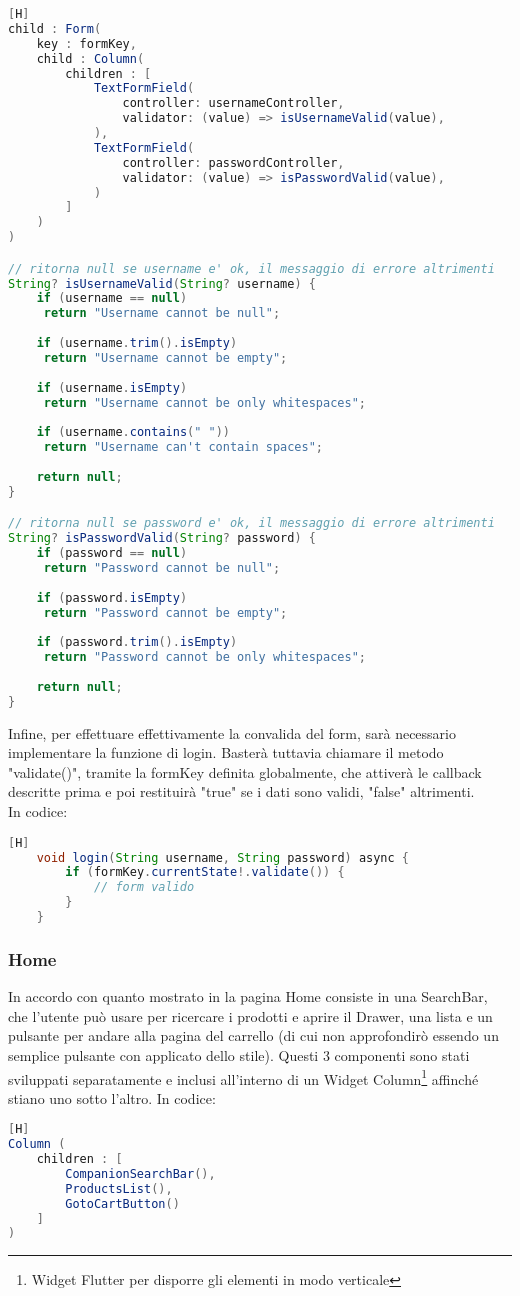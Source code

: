 \begin{lstlisting}[language=Java, firstnumber=9][H]
child : Form(
	key : formKey,
	child : Column(
		children : [
			TextFormField(
				controller: usernameController,
				validator: (value) => isUsernameValid(value),
			),
			TextFormField(
				controller: passwordController,
				validator: (value) => isPasswordValid(value),
			)
		]
	)
)

// ritorna null se username e' ok, il messaggio di errore altrimenti
String? isUsernameValid(String? username) {
	if (username == null) 
	 return "Username cannot be null";
	 
	if (username.trim().isEmpty)
	 return "Username cannot be empty";
	 
	if (username.isEmpty)
	 return "Username cannot be only whitespaces";
	 
	if (username.contains(" "))
	 return "Username can't contain spaces";
	
	return null;
}

// ritorna null se password e' ok, il messaggio di errore altrimenti
String? isPasswordValid(String? password) {
	if (password == null)
	 return "Password cannot be null";
	 
	if (password.isEmpty)
	 return "Password cannot be empty";
	 
	if (password.trim().isEmpty)
	 return "Password cannot be only whitespaces";
	
	return null;
}
\end{lstlisting}

\noindent
Infine, per effettuare effettivamente la convalida del form, sarà necessario implementare la funzione di login. Basterà tuttavia chiamare il metodo "validate()", tramite la formKey definita globalmente, che attiverà le callback descritte prima e poi restituirà "true" se i dati sono validi, "false" altrimenti.\\ In codice:
\begin{lstlisting}[language=Java, firstnumber=1][H]
	void login(String username, String password) async {
		if (formKey.currentState!.validate()) {
			// form valido
		}
	}
\end{lstlisting}

\noindent
\subsubsection{Home} \label{subsub:home}
In accordo con quanto mostrato in  la pagina Home consiste in una SearchBar, che l'utente può usare per ricercare i prodotti e aprire il Drawer, una lista e un pulsante per andare alla pagina del carrello (di cui non approfondirò essendo un semplice pulsante con applicato dello stile). Questi 3 componenti sono stati sviluppati separatamente e inclusi all'interno di un Widget Column\footnote{Widget Flutter per disporre gli elementi in modo verticale} affinché stiano uno sotto l'altro. In codice:
\begin{lstlisting}[language=Java, firstnumber=1][H]
Column (
	children : [
		CompanionSearchBar(),
		ProductsList(),
		GotoCartButton()
	]
)
\end{lstlisting}

